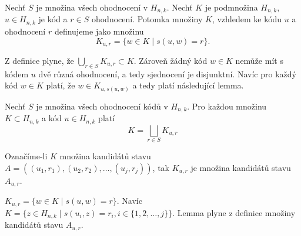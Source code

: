 \begin{definice}\label{lemmasjednocenipotomku}
  Nechť $S$ je množina všech ohodnocení v $H_{n,k}$. Nechť $K$ je podmnožina $H_{n,k}$, $ u \in H_{n,k}$ je kód a $r \in S$ ohodnocení. Potomka množiny $K$, vzhledem ke kódu $u$ a ohodnocení $r$ definujeme jako množinu 
  \[K_{u,r} = \{w \in K \mid s(u,w) = r\}.\] 
\end{definice}

Z definice plyne, že $\bigcup_{r\in S} K_{u,r} \subset K$. Zároveň žádný kód $w \in K$ nemůže mít s kódem $u$ dvě různá ohodnocení, a tedy sjednocení je disjunktní. Navíc pro každý kód $w \in K$ platí, že $w \in K_{u, s(u,w)}$ a tedy platí následující lemma.

\begin{lemma}
    Nechť $S$ je množina všech ohodnocení kódů v $H_{n,k}$. Pro každou množinu $K \subset H_{n,k}$ a kód $u \in H_{n,k}$ platí
    \[K = \bigsqcup_{r\in S} K_{u,r}\]
\end{lemma}



\begin{lemma}\label{lemmapotomcistavuakandidati}
    Označíme-li $K$ množina kandidátů stavu $A = \left((u_1, r_1), (u_2,r_2), \dots, (u_j,r_j)\right)$, tak $K_{u,r}$ je množina kandidátů stavu $A_{u,r}$.
\end{lemma}
\begin{dukaz}
    $K_{u,r} = \{w \in K \mid s(u,w) = r\}$. Navíc $K = \{z \in H_{n,k} \mid s(u_i,z) = r_i,  i \in \{1,2,\dots ,j\} \}$. Lemma plyne z definice množiny kandidátů stavu $A_{u,r}$.
\end{dukaz}


